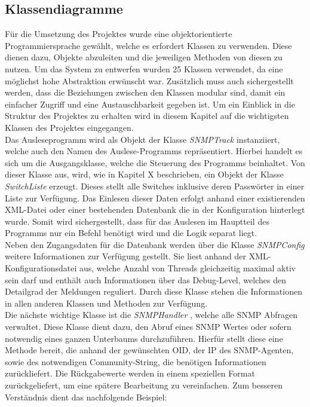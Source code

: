 \subsection{Klassendiagramme}
\label{subsec:classdiagrams}

Für die Umsetzung des Projektes wurde eine objektorientierte Programmiersprache gewählt, welche es erfordert Klassen zu verwenden.
Diese dienen dazu, Objekte abzuleiten und die jeweiligen Methoden von diesen zu nutzen.
Um das System zu entwerfen wurden 25 Klassen verwendet, da eine möglichst hohe Abstraktion erwünscht war.
Zusätzlich muss auch sichergestellt werden, dass die Beziehungen zwischen den Klassen modular sind, damit ein einfacher Zugriff und eine Austauschbarkeit gegeben ist.
Um ein Einblick in die Struktur des Projektes zu erhalten wird in diesem Kapitel auf die wichtigsten Klassen des Projektes eingegangen. \\
Das Ausleseprogramm wird als Objekt der Klasse \textit{SNMPTrack} instanziiert, welche auch den Namen des Auslese-Programms repräsentiert.
Hierbei handelt es sich um die Ausgangsklasse, welche die Steuerung des Programms beinhaltet. Von dieser Klasse aus, wird, wie in Kapitel X beschrieben, ein Objekt der Klasse \textit{SwitchListe} erzeugt.
Dieses stellt alle Switches inklusive deren Passwörter in einer Liste zur Verfügung.
Das Einlesen dieser Daten erfolgt anhand einer existierenden XML-Datei oder einer bestehenden Datenbank die in der Konfiguration hinterlegt wurde.
Somit wird sichergestellt, dass für das Auslesen im Hauptteil des Programms nur ein Befehl benötigt wird und die Logik separat liegt.\\
Neben den Zugangsdaten für die Datenbank werden über die Klasse \textit{SNMPConfig} weitere Informationen zur Verfügung gestellt.
Sie liest anhand der XML-Konfigurationsdatei aus, welche Anzahl von Threads gleichzeitig maximal aktiv sein darf und enthält auch Informationen über das Debug-Level, welches den Detailgrad der Meldungen reguliert.
Durch diese Klasse stehen die Informationen in allen anderen Klassen und Methoden zur Verfügung.\\
Die nächste wichtige Klasse ist die \textit{SNMPHandler} , welche alle SNMP Abfragen verwaltet.
Diese Klasse dient dazu, den Abruf eines SNMP Wertes oder sofern notwendig eines ganzen Unterbaums durchzuführen.
Hierfür stellt diese eine Methode bereit, die anhand der gewünschten OID, der IP des SNMP-Agenten, sowie des notwendigen Community-String, die benötigen Informationen  zurückliefert.
Die Rückgabewerte werden in einem speziellen Format zurückgeliefert, um eine spätere Bearbeitung zu vereinfachen. Zum besseren Verständnis dient das nachfolgende Beispiel:\\

